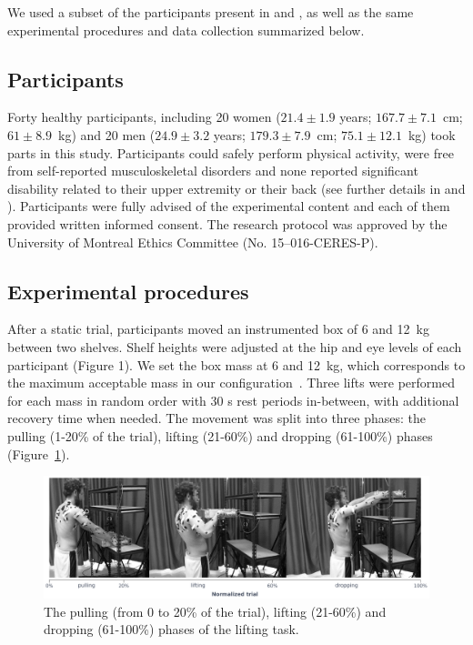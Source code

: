 We used a subset of the participants present in \citet{Martinez2019-mm} and \citet{Bouffard2019-fd}, as well as the same experimental procedures and data collection summarized below.

\subsection{Participants}\label{subsec:participants}

Forty healthy participants, including 20 women ($21.4 \pm 1.9$ years; $167.7 \pm 7.1$~cm; $61 \pm 8.9$~kg) and 20 men ($24.9 \pm 3.2$ years; $179.3 \pm 7.9$~cm; $75.1 \pm 12.1$~kg) took parts in this study.
Participants could safely perform physical activity, were free from self-reported musculoskeletal disorders and none reported significant disability related to their upper extremity or their back (see further details in \citet{Martinez2019-mm} and \citet{Bouffard2019-fd}).
Participants were fully advised of the experimental content and each of them provided written informed consent.
The research protocol was approved by the University of Montreal Ethics Committee (No. 15--016-CERES-P).

\subsection{Experimental procedures}\label{subsec:experimental-procedures}

After a static trial, participants moved an instrumented box of 6 and 12~kg between two shelves.
Shelf heights were adjusted at the hip and eye levels of each participant (Figure 1).
We set the box mass at 6 and 12~kg, which corresponds to the maximum acceptable mass in our configuration~\cite{Snook1991-yo}.
Three lifts were performed for each mass in random order with 30 s rest periods in-between, with additional recovery time when needed.
The movement was split into three phases: the pulling (1-20\% of the trial), lifting (21-60\%) and dropping (61-100\%) phases (Figure~\ref{fig:phases}).

\begin{figure}[H]
    \centering\includegraphics[width=1\linewidth]{fig/phases.pdf}
    \caption{The pulling (from 0 to 20\% of the trial), lifting (21-60\%) and dropping (61-100\%) phases of the lifting task.}
    \label{fig:phases}
\end{figure}

